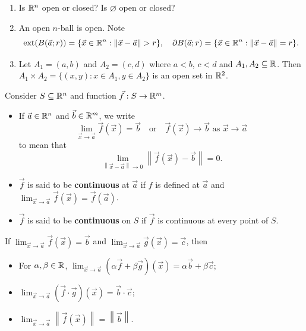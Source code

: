 \documentclass[a4paper]{ctexart}
\begin{document}
    \begin{myex}
        \begin{enumerate}[label=(\arabic*),start=0]
            \item Is $\mathbb{R}^n$ open or closed? Is $\varnothing$ open or closed?
            \item An open $n$-ball is open. Note
            $$ \operatorname{ext}(B(\vec a; r)) = \{ \vec x\in \mathbb{R}^n : \| \vec x - \vec a\| > r\}, \quad \partial B(\vec a; r) = \{ \vec x\in \mathbb{R}^n : \| \vec x - \vec a\| = r\}. $$
            \item Let $A_1 = (a,b)$ and $A_2 = (c,d)$ where $a<b$, $c<d$ and $A_1, A_2 \subseteq \mathbb{R}$. Then $A_1\times A_2 = \{ (x,y) : x\in A_1, y\in A_2\}$ is an open set in $\mathbb{R}^2$.
        \end{enumerate}
    \end{myex}
    \begin{mydef}
        Consider $S \subseteq \mathbb{R}^n$ and function $\vec f:S\to \mathbb{R}^m$. 
        \begin{itemize}
            \item If $\vec a\in \mathbb{R}^n$ and $\vec b \in \mathbb{R}^m$, we write $$ \lim_{\vec x \to \vec a} \vec f(\vec x) = \vec b \quad \text{or} \quad \vec f(\vec x) \to \vec b \text{ as } \vec x \to \vec a $$ to mean that $$ \lim_{\left\|\vec x - \vec a\right\| \to 0} \left\|\vec f(\vec x) - \vec b\right\| = 0. $$
            \item $\vec f$ is said to be \textbf{continuous} at $\vec a$ if $f$ is defined at $\vec a$ and $\displaystyle \lim_{\vec x \to \vec a} \vec f(\vec x) = \vec f(\vec a)$.
            \item $\vec f$ is said to be \textbf{continuous} on $S$ if $\vec f$ is continuous at every point of $S$.
        \end{itemize}
    \end{mydef}
    \begin{mythm}
        If $\displaystyle \lim_{\vec x \to \vec a} \vec f(\vec x) = \vec b$ and $\displaystyle \lim_{\vec x \to \vec a} \vec g(\vec x) = \vec c$, then
        \begin{itemize}
            \item For $\alpha, \beta \in \mathbb{R}$, $\displaystyle \lim_{\vec x \to \vec a} (\alpha \vec f + \beta \vec g)(\vec x) = \alpha \vec b + \beta \vec c$;
            \item $\displaystyle \lim_{\vec x \to \vec a} (\vec f \cdot \vec g)(\vec x) = \vec b \cdot \vec c$;
            \item $\displaystyle \lim_{\vec x \to \vec a} \left\|\vec f (\vec x) \right\| = \left\|\vec b\right\|$.
        \end{itemize}
    \end{mythm}
\end{document}
